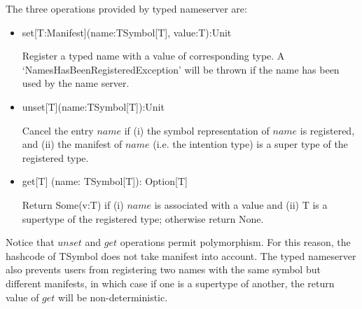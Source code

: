 The three operations provided by typed nameserver are:
\begin{itemize}
  \item set[T:Manifest](name:TSymbol[T], value:T):Unit

Register a typed name with a value of corresponding type.  A \lq{}NamesHasBeenRegisteredException\rq{} will be thrown if the name has been used by the name server.

  \item unset[T](name:TSymbol[T]):Unit

Cancel the entry $name$ if (i)  the symbol representation of $name$ is registered, and (ii) the manifest of $name$ (i.e. the intention type) is a super type of the registered type.

  \item get[T] (name: TSymbol[T]): Option[T]

Return Some(v:T) if (i) $name$ is associated with a value and (ii) T is a supertype of the registered type; otherwise return None.
\end{itemize}

Notice that $unset$ and $get$ operations permit polymorphism.  For this reason, the hashcode of TSymbol does not take manifest into account.  The typed nameserver also prevents users from registering two names with the same symbol but different manifests, in which case if one is a supertype of another, the return value of $get$ will be non-deterministic.



